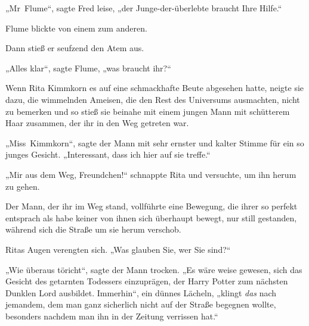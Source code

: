 „Mr~Flume“, sagte Fred leise, „der Junge-der-überlebte braucht Ihre Hilfe.“

Flume blickte von einem zum anderen.

Dann stieß er seufzend den Atem aus.

„Alles klar“, sagte Flume, „was braucht ihr?“


Wenn Rita Kimmkorn es auf eine schmackhafte Beute abgesehen hatte, neigte sie dazu, die wimmelnden Ameisen, die den Rest des Universums ausmachten, nicht zu bemerken und so stieß sie beinahe mit einem jungen Mann mit schütterem Haar zusammen, der ihr in den Weg getreten war.

„Miss~Kimmkorn“, sagte der Mann mit sehr ernster und kalter Stimme für ein so junges Gesicht. „Interessant, dass ich hier auf sie treffe.“

„Mir aus dem Weg, Freundchen!“ schnappte Rita und versuchte, um ihn herum zu gehen.

Der Mann, der ihr im Weg stand, vollführte eine Bewegung, die ihrer so perfekt entsprach als habe keiner von ihnen sich überhaupt bewegt, nur still gestanden, während sich die Straße um sie herum verschob.

Ritas Augen verengten sich. „Was glauben Sie, wer Sie sind?“

„Wie überaus töricht“, sagte der Mann trocken. „Es wäre weise gewesen, sich das Gesicht des getarnten Todessers einzuprägen, der Harry Potter zum nächsten Dunklen Lord ausbildet. Immerhin“, ein dünnes Lächeln, „klingt \emph{das} nach jemandem, dem man ganz sicherlich nicht auf der Straße begegnen wollte, besonders nachdem man ihn in der Zeitung verrissen hat.“

